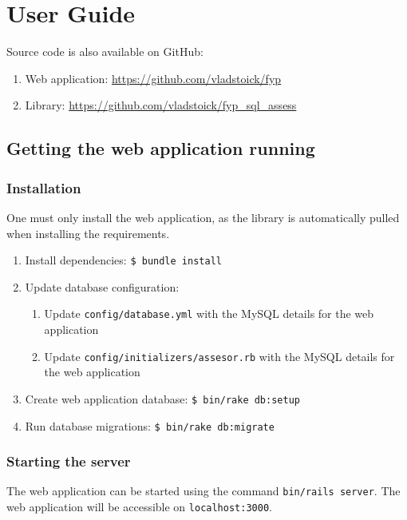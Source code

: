 \chapter{User Guide}

Source code is also available on GitHub:
\begin{enumerate}
    \item Web application: \url{https://github.com/vladstoick/fyp}
    \item Library: \url{https://github.com/vladstoick/fyp_sql_assess}
\end{enumerate}

\section{Getting the web application running}
\subsection{Installation}
One must only install the web application, as the library is automatically pulled when installing the requirements.

\begin{enumerate}
    \item Install dependencies: \texttt{\$ bundle install}
    \item Update database configuration:
    \begin{enumerate}
        \item Update \texttt{config/database.yml} with the MySQL details for the web application
        \item Update \texttt{config/initializers/assesor.rb} with the MySQL details for the web application
    \end{enumerate}
    \item Create web application database: \texttt{\$ bin/rake db:setup}
    \item Run database migrations: \texttt{\$ bin/rake db:migrate}
\end{enumerate}

\subsection{Starting the server}

The web application can be started using the command \texttt{bin/rails server}. The web application will be accessible on \texttt{localhost:3000}.

